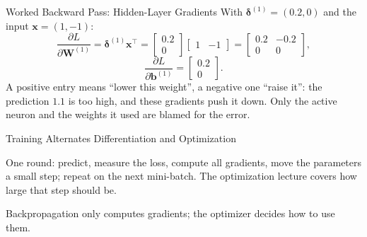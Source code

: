 \documentclass{ntuabeamer}
\begin{document}
\begin{frame}{Worked Backward Pass: Hidden-Layer Gradients}
  With $\boldsymbol\delta^{(1)}=(0.2,0)$ and the input $\mathbf x=(1,-1)$:
  \[
    \frac{\partial L}{\partial\mathbf W^{(1)}}
    =\boldsymbol\delta^{(1)}\mathbf x^\top
    =\begin{bmatrix}0.2\\0\end{bmatrix}
      \begin{bmatrix}1&-1\end{bmatrix}
    =\begin{bmatrix}0.2&-0.2\\0&0\end{bmatrix},
  \]
  \[
    \frac{\partial L}{\partial\mathbf b^{(1)}}
    =\begin{bmatrix}0.2\\0\end{bmatrix}.
  \]
  A positive entry means ``lower this weight'', a negative one ``raise it'': the prediction $1.1$ is too high, and these gradients push it down.
  Only the active neuron and the weights it used are blamed for the error.
\end{frame}

\begin{frame}{Training Alternates Differentiation and Optimization}
  \centering

  \vspace{0.2cm}
  One round: predict, measure the loss, compute all gradients, move the parameters a small step; repeat on the next mini-batch.
  The optimization lecture covers how large that step should be.

  Backpropagation only computes gradients; the optimizer decides how to use them.
\end{frame}
\end{document}
